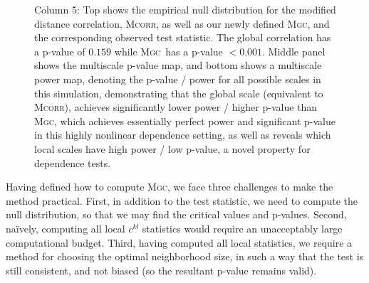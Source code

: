 \documentclass[11pt]{article}
\providecommand{\sct}[1]{{\normalfont\textsc{#1}}}
\providecommand{\mc}[1]{\mathcal{#1}}
\newcommand{\G}{c}
\newcommand{\Mgc}{\sct{Mgc}}
\newcommand{\Mcorr}{\sct{Mcorr}}
\begin{document}
\begin{figure}[htbp]
{Column 5: Top shows the empirical null distribution for the modified distance correlation, \Mcorr \cite{SzekelyRizzo2013a}, as well as our newly defined \Mgc, and the corresponding observed test statistic. The global correlation has a p-value of $0.159$ while \Mgc~has a p-value $<0.001$.
Middle panel shows the multiscale p-value map, and bottom shows a multiscale power map, denoting the p-value / power for all possible scales in this simulation, demonstrating that the global scale (equivalent to \Mcorr), achieves significantly lower power / higher p-value than \Mgc, which achieves essentially perfect power and significant p-value in this highly nonlinear dependence setting, as well as reveals which local scales have high power / low p-value, a novel property for dependence tests.
}
\label{f:schematic}
\end{figure}
%

Having defined how to compute \Mgc, we face three challenges to make the method practical. First, in addition to the test statistic, we need to compute the null distribution, so that we may find the critical values and p-values.
Second, na\"ively, computing all local $\G^{kl}$ statistics would require an unacceptably large computational budget.
Third, having computed all local statistics, we require a method for choosing the optimal neighborhood size, in such a way that the test is still consistent, and not biased (so the resultant p-value remains valid).
\end{document}

